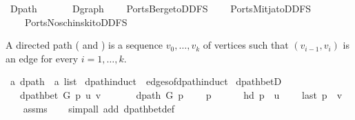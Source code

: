 %
\begin{isabellebody}%
%
%
\isadelimtheory
%
\endisadelimtheory
%
\isatagtheory
{}\isamarkupfalse%
\ Dpath\isanewline
\ \ \isanewline
\ \ \ \ Dgraph\isanewline
\ \ \ \ Ports{\isachardot}{\kern0pt}Berge{\isacharunderscore}{\kern0pt}to{\isacharunderscore}{\kern0pt}DDFS\isanewline
\ \ \ \ Ports{\isachardot}{\kern0pt}Mitja{\isacharunderscore}{\kern0pt}to{\isacharunderscore}{\kern0pt}DDFS\isanewline
\ \ \ \ Ports{\isachardot}{\kern0pt}Noschinski{\isacharunderscore}{\kern0pt}to{\isacharunderscore}{\kern0pt}DDFS\isanewline
{}%
\endisatagtheory
{\isafoldtheory}%
%
\isadelimtheory
%
\endisadelimtheory
%
\begin{isamarkuptext}%
A directed path ( and ) is a sequence $v_0,\dots,v_k$ of vertices such
that $(v_{i-1},v_i)$ is an edge for every $i=1,\dots,k$.%
\end{isamarkuptext}\isamarkuptrue%
\isamarkupfalse%
\ {\isacharprime}{\kern0pt}a\ dpath\ {\isacharequal}{\kern0pt}\ {\isachardoublequoteopen}{\isacharprime}{\kern0pt}a\ list{\isachardoublequoteclose}\isanewline
\isanewline
{}\isamarkupfalse%
\ dpath{\isacharunderscore}{\kern0pt}induct\ {\isacharequal}{\kern0pt}\ edges{\isacharunderscore}{\kern0pt}of{\isacharunderscore}{\kern0pt}dpath{\isachardot}{\kern0pt}induct\isanewline
%
\isadeliminvisible
\isanewline
%
\endisadeliminvisible
%
\isataginvisible
{}\isamarkupfalse%
\ dpath{\isacharunderscore}{\kern0pt}betD{\isacharcolon}{\kern0pt}\isanewline
\ \ \ {\isachardoublequoteopen}dpath{\isacharunderscore}{\kern0pt}bet\ G\ p\ u\ v{\isachardoublequoteclose}\isanewline
\ \ \isanewline
\ \ \ \ {\isachardoublequoteopen}dpath\ G\ p{\isachardoublequoteclose}\isanewline
\ \ \ \ {\isachardoublequoteopen}p\ {\isasymnoteq}\ {\isacharbrackleft}{\kern0pt}{\isacharbrackright}{\kern0pt}{\isachardoublequoteclose}\isanewline
\ \ \ \ {\isachardoublequoteopen}hd\ p\ {\isacharequal}{\kern0pt}\ u{\isachardoublequoteclose}\isanewline
\ \ \ \ {\isachardoublequoteopen}last\ p\ {\isacharequal}{\kern0pt}\ v{\isachardoublequoteclose}%
\endisataginvisible
{\isafoldinvisible}%
%
\isadeliminvisible
\isanewline
%
\endisadeliminvisible
%
\isadelimproof
\ \ %
\endisadelimproof
%
\isatagproof
{}\isamarkupfalse%
\ assms\isanewline
\ \ \isamarkupfalse%
\ {\isacharparenleft}{\kern0pt}simp{\isacharunderscore}{\kern0pt}all\ add{\isacharcolon}{\kern0pt}\ dpath{\isacharunderscore}{\kern0pt}bet{\isacharunderscore}{\kern0pt}def{\isacharparenright}{\kern0pt}%

\end{isabellebody}
